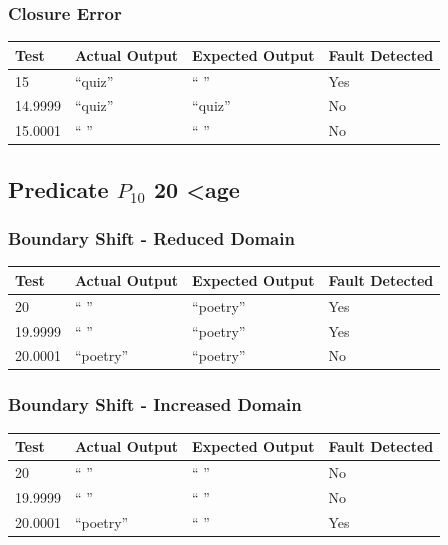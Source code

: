 \documentclass[11pt, oneside]{article}   	%
\begin{document}
\subsubsection{Closure Error}
\begin{table}[!htb]
\centering
\begin{tabular}{|l|l|l|l|}
\hline
Test    & Actual Output & Expected Output & Fault Detected \\ \hline
15      & “quiz”        & “ ”             & Yes            \\ \hline
14.9999 & “quiz”        & “quiz”          & No             \\ \hline
15.0001 & “ ”           & “ ”             & No             \\ \hline
\end{tabular}
\end{table}
\newpage

\subsection{Predicate $P_{10}$ 20 \textless age}
\subsubsection{Boundary Shift - Reduced Domain}
\begin{table}[!htb]
\centering
\begin{tabular}{|l|l|l|l|}
\hline
Test    & Actual Output & Expected Output & Fault Detected \\ \hline
20      & “ ”           & “poetry”        & Yes            \\ \hline
19.9999 & “ ”           & “poetry”        & Yes            \\ \hline
20.0001 & “poetry”      & “poetry”        & No             \\ \hline
\end{tabular}
\end{table}

\subsubsection{Boundary Shift - Increased Domain}
\begin{table}[!htb]
\centering
\begin{tabular}{|l|l|l|l|}
\hline
Test    & Actual Output & Expected Output & Fault Detected \\ \hline
20      & “ ”           & “ ”             & No             \\ \hline
19.9999 & “ ”           & “ ”             & No             \\ \hline
20.0001 & “poetry”      & “ ”             & Yes            \\ \hline
\end{tabular}
\end{table}
\end{document}
